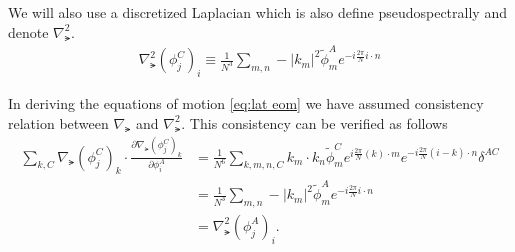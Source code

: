 We will also use a discretized Laplacian which is also define pseudospectrally and denote $\nabla^2_\lat$.
\begin{align}
  \nabla^2_\lat(\phi^C_j)_i \equiv \frac{1}{N^3} \sum_{m,n} -|k_m|^2 \tilde{\phi}^A_m e^{-i\frac{2\pi}{N}i\cdot n}
\end{align}

In deriving the equations of motion \eqref{eq:lat eom} we have assumed consistency relation between $\nabla_\lat$ and $\nabla^2_\lat$. This consistency can be verified as follows
\begin{align}
  \sum_{k,C}\nabla_\lat(\phi^C_j)_k \cdot \frac{\partial\nabla_\lat(\phi^C_j)_k}{\partial\phi^A_i}
  &= \frac{1}{N^6} \sum_{k,m,n,C} k_m\cdot k_n \tilde{\phi}^C_m e^{i\frac{2\pi}{N}(k)\cdot m} e^{-i\frac{2\pi}{N}(i-k)\cdot n} \delta^{AC} \\
  &= \frac{1}{N^3} \sum_{m,n} -|k_m|^2 \tilde{\phi}^A_m e^{-i\frac{2\pi}{N}i\cdot n} \\
  &= \nabla^2_\lat(\phi^A_j)_i.
\end{align}
